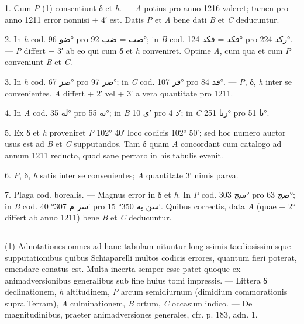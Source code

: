 \documentclass[11pt]{article}
\newcommand{\Name}[1]{{\addfontfeatures{LetterSpace=12}#1}}
\begin{document}
{\small
\par\hangindent=12mm 1. Cum \textit{P} (1) consentiunt δ et \textit{h}. — \textit{A} potius pro anno 1216 valeret; tamen pro anno 1211 error nonnisi + 4′ est. Datis \textit{P} et \textit{A} bene dati \textit{B} et \textit{C} deducuntur.
\par\hangindent=12mm 2. In \textit{h} cod. \textarabic{ضو} 96° pro \textarabic{ضٮ} = \textarabic{ضب} 92°; in \textit{B} cod. \textarabic{ٯكد} = \textarabic{قكد} 124° pro \textarabic{ركد} 224°. — \textit{P} differt − 3′ ab eo qui cum δ et \textit{h} conveniret. Optime \textit{A}, cum qua et cum \textit{P} conveniunt \textit{B} et \textit{C}.
\par\hangindent=12mm 3. In \textit{h} cod. \textarabic{صز} 67° pro \textarabic{ضز} 97°; in \textit{C} cod. \textarabic{قز} 107° pro \textarabic{فد} 84°. — \textit{P}, δ, \textit{h} inter se convenientes. \textit{A} differt + 2′ vel + 3′ a vera quantitate pro 1211.
\par\hangindent=12mm 4. In \textit{A} cod. \textarabic{له} 35° pro \textarabic{نه} 55°; in \textit{B} \textarabic{ى} 10′ pro \textarabic{د} 4′; in \textit{C} \textarabic{رنا} 251° pro \textarabic{نا} 51°.
\par\hangindent=12mm 5. Ex δ et \textit{h} proveniret \textit{P} 102° 40′ loco codicis 102° 50′; sed hoc numero auctor usus est ad \textit{B} et \textit{C} supputandos. Tam δ quam \textit{A} concordant cum catalogo ad annum 1211 reducto, quod sane perraro in his tabulis evenit.
\par\hangindent=12mm 6. \textit{P}, δ, \textit{h} satis inter se convenientes; \textit{A} quantitate 3′ nimis parva.
\par\hangindent=12mm 7. Plaga cod. borealis. — Magnus error in δ et \textit{h}. In \textit{P} cod. \textarabic{سج} 303° pro \textarabic{صج} 63°; in \textit{B} cod. \textarabic{سز م} 307° 40′ pro \textarabic{سن يه} 350° 15′. Quibus correctis, data \textit{A} (quae − 2° differt ab anno 1211) bene \textit{B} et \textit{C} deducuntur.
\par}
\par\vspace{2mm}\begin{center}\rule{40mm}{.4pt}\end{center}{\small (1) Adnotationes omnes ad hanc tabulam nituntur longissimis taediosissimisque supputationibus quibus \Name{Schiaparelli} multos codicis errores, quantum fieri poterat, emendare conatus est. Multa incerta semper esse patet quoque ex animadversionibus generalibus sub fine huius tomi impressis. — Littera δ declinationem, \textit{h} altitudinem, \textit{P} arcum semidiurnum (dimidium commorationis supra Terram), \textit{A} culminationem, \textit{B} ortum, \textit{C} occasum indico. — De magnitudinibus, praeter animadversiones generales, cfr. p. 183, adn. 1.}
\end{document}
